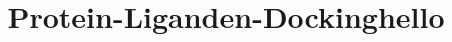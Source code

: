 \documentclass[11pt]{article}
\title{Protein-Liganden-Docking}
\begin{document}
\title{hello}
\end{document}
